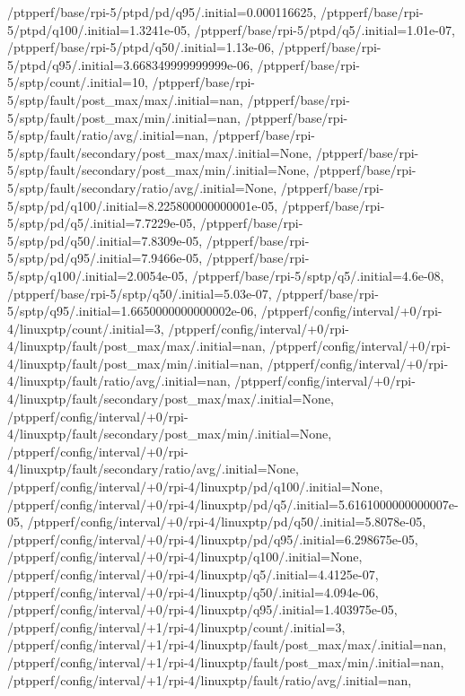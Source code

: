 {    /ptpperf/base/rpi-5/ptpd/pd/q95/.initial=0.000116625,
    /ptpperf/base/rpi-5/ptpd/q100/.initial=1.3241e-05,
    /ptpperf/base/rpi-5/ptpd/q5/.initial=1.01e-07,
    /ptpperf/base/rpi-5/ptpd/q50/.initial=1.13e-06,
    /ptpperf/base/rpi-5/ptpd/q95/.initial=3.668349999999999e-06,
    /ptpperf/base/rpi-5/sptp/count/.initial=10,
    /ptpperf/base/rpi-5/sptp/fault/post_max/max/.initial=nan,
    /ptpperf/base/rpi-5/sptp/fault/post_max/min/.initial=nan,
    /ptpperf/base/rpi-5/sptp/fault/ratio/avg/.initial=nan,
    /ptpperf/base/rpi-5/sptp/fault/secondary/post_max/max/.initial=None,
    /ptpperf/base/rpi-5/sptp/fault/secondary/post_max/min/.initial=None,
    /ptpperf/base/rpi-5/sptp/fault/secondary/ratio/avg/.initial=None,
    /ptpperf/base/rpi-5/sptp/pd/q100/.initial=8.225800000000001e-05,
    /ptpperf/base/rpi-5/sptp/pd/q5/.initial=7.7229e-05,
    /ptpperf/base/rpi-5/sptp/pd/q50/.initial=7.8309e-05,
    /ptpperf/base/rpi-5/sptp/pd/q95/.initial=7.9466e-05,
    /ptpperf/base/rpi-5/sptp/q100/.initial=2.0054e-05,
    /ptpperf/base/rpi-5/sptp/q5/.initial=4.6e-08,
    /ptpperf/base/rpi-5/sptp/q50/.initial=5.03e-07,
    /ptpperf/base/rpi-5/sptp/q95/.initial=1.6650000000000002e-06,
    /ptpperf/config/interval/+0/rpi-4/linuxptp/count/.initial=3,
    /ptpperf/config/interval/+0/rpi-4/linuxptp/fault/post_max/max/.initial=nan,
    /ptpperf/config/interval/+0/rpi-4/linuxptp/fault/post_max/min/.initial=nan,
    /ptpperf/config/interval/+0/rpi-4/linuxptp/fault/ratio/avg/.initial=nan,
    /ptpperf/config/interval/+0/rpi-4/linuxptp/fault/secondary/post_max/max/.initial=None,
    /ptpperf/config/interval/+0/rpi-4/linuxptp/fault/secondary/post_max/min/.initial=None,
    /ptpperf/config/interval/+0/rpi-4/linuxptp/fault/secondary/ratio/avg/.initial=None,
    /ptpperf/config/interval/+0/rpi-4/linuxptp/pd/q100/.initial=None,
    /ptpperf/config/interval/+0/rpi-4/linuxptp/pd/q5/.initial=5.6161000000000007e-05,
    /ptpperf/config/interval/+0/rpi-4/linuxptp/pd/q50/.initial=5.8078e-05,
    /ptpperf/config/interval/+0/rpi-4/linuxptp/pd/q95/.initial=6.298675e-05,
    /ptpperf/config/interval/+0/rpi-4/linuxptp/q100/.initial=None,
    /ptpperf/config/interval/+0/rpi-4/linuxptp/q5/.initial=4.4125e-07,
    /ptpperf/config/interval/+0/rpi-4/linuxptp/q50/.initial=4.094e-06,
    /ptpperf/config/interval/+0/rpi-4/linuxptp/q95/.initial=1.403975e-05,
    /ptpperf/config/interval/+1/rpi-4/linuxptp/count/.initial=3,
    /ptpperf/config/interval/+1/rpi-4/linuxptp/fault/post_max/max/.initial=nan,
    /ptpperf/config/interval/+1/rpi-4/linuxptp/fault/post_max/min/.initial=nan,
    /ptpperf/config/interval/+1/rpi-4/linuxptp/fault/ratio/avg/.initial=nan,
}

